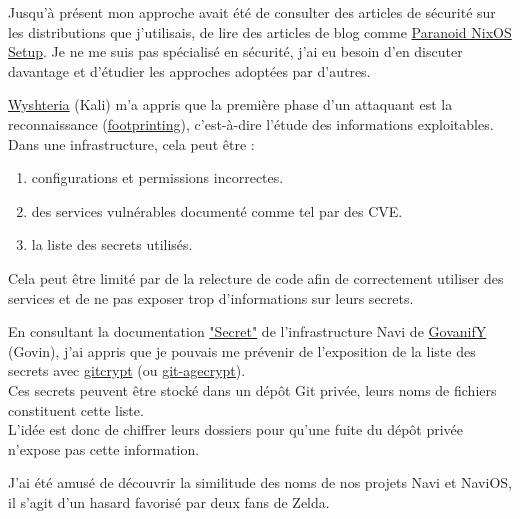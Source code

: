 \documentclass[a4paper,11pt]{article}
\begin{document}
\begin{blogmain}
Jusqu'à présent mon approche avait été de consulter des articles de sécurité sur les distributions que j'utilisais, de lire des articles de blog comme \href{https://xeiaso.net/blog/paranoid-nixos-2021-07-18}{Paranoid NixOS Setup}.
Je ne me suis pas spécialisé en sécurité, j'ai eu besoin d'en discuter davantage et d'étudier les approches adoptées par d’autres.

\href{https://github.com/Wyshteria}{Wyshteria} (Kali) m'a appris que la première phase d'un attaquant est la reconnaissance (\href{https://fr.wikipedia.org/wiki/Footprinting}{footprinting}), c'est-à-dire l'étude des informations exploitables. \\
Dans une infrastructure, cela peut être :
\begin{enumerate}
  \item configurations et permissions incorrectes.
  \item des services vulnérables documenté comme tel par des CVE.
  \item la liste des secrets utilisés.
\end{enumerate}

Cela peut être limité par de la relecture de code afin de correctement utiliser des services et de ne pas exposer trop d'informations sur leurs secrets.

En consultant la documentation \href{https://projects.govanify.com/govanify/navi/-/blob/master/docs/secrets.txt?ref_type=heads}{"Secret"} de l'infrastructure Navi de \href{https://github.com/GovanifY}{GovanifY} (Govin), j'ai appris que je pouvais me prévenir de l'exposition de la liste des secrets avec \href{https://github.com/AGWA/git-crypt?tab=readme-ov-file#readme}{gitcrypt} (ou \href{https://github.com/vlaci/git-agecrypt}{git-agecrypt}). \\
Ces secrets peuvent être stocké dans un dépôt Git privée, leurs noms de fichiers constituent cette liste. \\
L'idée est donc de chiffrer leurs dossiers pour qu'une fuite du dépôt privée n'expose pas cette information.


  J'ai été amusé de découvrir la similitude des noms de nos projets Navi et NaviOS, il s'agit d'un hasard favorisé par deux fans de Zelda.



\end{blogmain}
\end{document}
